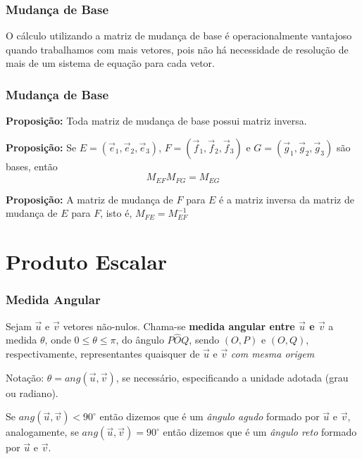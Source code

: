 \documentclass[hyperref={pdfpagelabels=false}]{beamer}
\begin{document}
\begin{frame}
	\frametitle{Mudança de Base}
	
	O cálculo utilizando a matriz de mudança de base é operacionalmente vantajoso quando trabalhamos com mais vetores, pois não há necessidade de resolução de mais de um sistema de equação para cada vetor.
	
\end{frame}

\begin{frame}
	\frametitle{Mudança de Base}
	
	{\bf Proposição: } Toda matriz de mudança de base possui matriz inversa.

	\pause

	{\bf Proposição: } Se $E = (\overrightarrow{e}_1,\overrightarrow{e}_2,\overrightarrow{e}_3)$, $F = (\overrightarrow{f}_1,\overrightarrow{f}_2,\overrightarrow{f}_3)$ e $G = (\overrightarrow{g}_1,\overrightarrow{g}_2,\overrightarrow{g}_3)$ são bases, então $$M_{EF}M_{FG} = M_{EG}$$
	
	\pause
	
	{\bf Proposição: } A matriz de mudança de $F$ para $E$ é a matriz inversa da matriz de mudança de $E$ para $F$, isto é, $M_{FE} = M_{EF}^{-1}$
	
\end{frame}

\section{Produto Escalar}

\begin{frame}
	\frametitle{Medida Angular}
	
	Sejam $\overrightarrow{u}$ e $\overrightarrow{v}$ vetores não-nulos. Chama-se {\bf medida angular entre $\overrightarrow{u}$ e $\overrightarrow{v}$} a medida $\theta$, onde $0 \leq \theta \leq \pi$, do ângulo $P\hat{O}Q$, sendo $(O,P)$ e $(O,Q)$, respectivamente, representantes quaisquer de $\overrightarrow{u}$ e $\overrightarrow{v}$ \emph{com mesma origem}
	
	Notação: $\theta = ang(\overrightarrow{u},\overrightarrow{v})$, se necessário, especificando a unidade adotada (grau ou radiano).
	
	\pause
	
	Se $ang(\overrightarrow{u},\overrightarrow{v}) < 90^{\circ}$ então dizemos que é um \emph{ângulo agudo} formado por $\overrightarrow{u}$ e $\overrightarrow{v}$, analogamente, se $ang(\overrightarrow{u},\overrightarrow{v}) = 90^{\circ}$ então dizemos que é um \emph{ângulo reto} formado por $\overrightarrow{u}$ e $\overrightarrow{v}$.
\end{frame}
\end{document}
